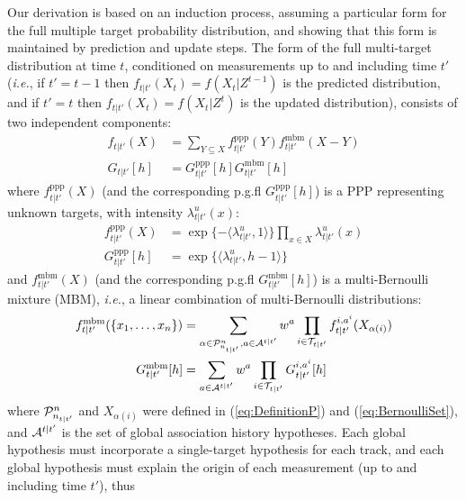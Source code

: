 \documentclass[journal,twoside]{IEEEtran}
\theoremstyle{plain}
\begin{document}
Our derivation is based on an induction process, assuming a particular form for the full multiple target probability distribution, and showing that this form is maintained by prediction and update steps. The form of the full multi-target distribution at time $t$, conditioned on measurements up to and including time $t'$ (\textit{i.e.}\xspace, if $t'=t-1$ then $f_{t|t'}(X_t)=f(X_t|Z^{t-1})$ is the predicted distribution, and if $t'=t$ then $f_{t|t'}(X_t)=f(X_t|Z^t)$ is the updated distribution), consists of two independent components:
%
\begin{equation}
\begin{split}
f_{t|t'}(X) &= \sum_{Y\subseteq X}f^\mathrm{ppp}_{t|t'}(Y) f^\mathrm{mbm}_{t|t'}(X-Y) \\
G_{t|t'}[h] &= G^\mathrm{ppp}_{t|t'}[h] G^\mathrm{mbm}_{t|t'}[h]
\end{split}
\label{eq:FullDensity}
\end{equation}
%
where $f^\mathrm{ppp}_{t|t'}(X)$ (and the corresponding p.g.fl $G^\mathrm{ppp}_{t|t'}[h]$) is a PPP representing unknown targets, with intensity $\lambda^u_{t|t'}(x)$:
%
\begin{equation}
\begin{split}
f^\mathrm{ppp}_{t|t'}(X) &= \exp\{-\langle\lambda^u_{t|t'},1\rangle\}\prod_{x\in X}\lambda^u_{t|t'}(x) \\
G^\mathrm{ppp}_{t|t'}[h] &= \exp\{\langle\lambda^u_{t|t'},h-1\rangle\}
\end{split}
\label{eq:UndetectedTargets}
\end{equation}
%
and $f^\mathrm{mbm}_{t|t'}(X)$ (and the corresponding p.g.fl $G^\mathrm{mbm}_{t|t'}[h]$) is a multi-Bernoulli mixture (MBM), \textit{i.e.}\xspace, a linear combination of multi-Bernoulli distributions:
%
\begin{align}
f^\mathrm{mbm}_{t|t'}(\{x_1,\dots,x_n\}) &= \sum_{\alpha\in{\cal P}_{n_{t|t'}}^n,a\in{\cal A}^{t|t'}} w^a
\prod_{i\in{\cal T}_{t|t'}}f_{t|t'}^{i,a^i}(X_{\alpha(i)}) \notag\\
G^\mathrm{mbm}_{t|t'}[h] &= \sum_{a\in{\cal A}^{t|t'}} w^a\prod_{i\in{\cal T}_{t|t'}}G_{t|t'}^{i,a^i}[h]
\label{eq:PreexistingTargets}
\end{align}
%
where ${\cal P}_{n_{t|t'}}^n$ and $X_{\alpha(i)}$ were defined in (\ref{eq:DefinitionP}) and (\ref{eq:BernoulliSet}), and
${\cal A}^{t|t'}$ is the set of global association history hypotheses. Each global hypothesis must incorporate a single-target hypothesis for each track, and each global hypothesis must explain the origin of each measurement (up to and including time $t'$), thus
\end{document}
